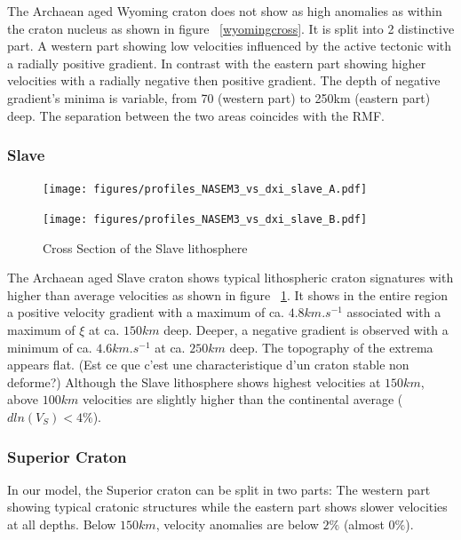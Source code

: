 \documentclass[12pt]{article}
\begin{document}
The Archaean aged Wyoming craton does not show as high anomalies as within the craton nucleus as shown in figure ~\ref{wyomingcross}. 
It is split into 2 distinctive part. A western part showing low velocities influenced by the active tectonic with a radially positive gradient. 
In contrast with the eastern part showing higher velocities with a radially negative then positive gradient. 
The depth of negative gradient's minima is variable, from 70 (western part) to 250km (eastern part) deep. 
The separation between the two areas coincides with the RMF.

\subsubsection{Slave}

	\begin{figure}
		\begin{minipage}{0.5\linewidth}
			\centerline{\texttt{[image: figures/profiles\_NASEM3\_vs\_dxi\_slave\_A.pdf]}}
		\end{minipage}
		\hfill
		\begin{minipage}{0.5\linewidth}
			\centerline{\texttt{[image: figures/profiles\_NASEM3\_vs\_dxi\_slave\_B.pdf]}}
		\end{minipage}

		\caption{Cross Section of the Slave lithosphere}
		\label{slavecross}

	\end{figure}

	The Archaean aged Slave craton shows typical lithospheric craton signatures with higher than average velocities as shown in figure ~\ref{slavecross}. 
	It shows in the entire region a positive velocity gradient with a maximum of ca. $4.8km.s^{-1}$ associated with a maximum of $\xi$ at ca. $150km$ deep.
	Deeper, a negative gradient is observed with a minimum of ca. $4.6km.s^{-1}$ at ca. $250km$ deep. 
	The topography of the extrema appears flat. (Est ce que c'est une characteristique d'un craton stable non deforme?)
	Although the Slave lithosphere shows highest velocities at $150km$, above $100km$ velocities are slightly higher than the continental average ($dln(V_S)< 4\%$).

\subsubsection{Superior Craton}
	In our model, the Superior craton can be split in two parts: The western part showing typical cratonic structures while the eastern part shows slower velocities at all depths. Below $150km$, velocity anomalies are below $2\%$ (almost $0\%$). 
\end{document}

